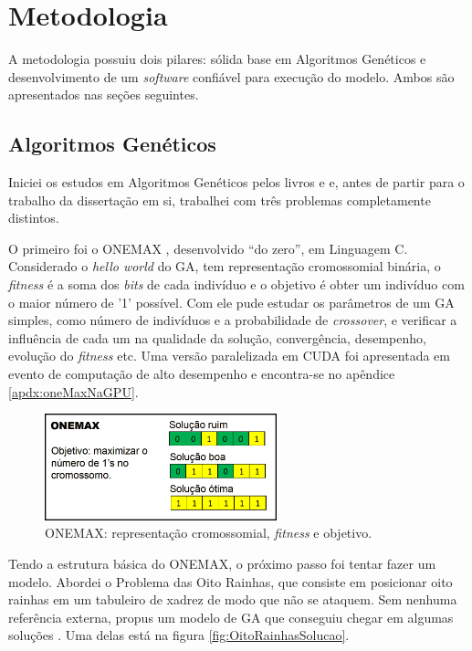 \chapter{Metodologia\label{cap:metodologia}}

	A metodologia possuiu dois pilares: sólida base em Algoritmos Genéticos e desenvolvimento de um \emph{software} confiável para execução do modelo. Ambos são apresentados nas seções seguintes.

\section{Algoritmos Genéticos}\label{seq:medologia_ga}
	
	Iniciei os estudos em Algoritmos Genéticos pelos livros \cite{Mitchell98} e \cite{Linden2008} e, antes de partir para o trabalho da dissertação em si, trabalhei com três problemas completamente distintos.
	
	O primeiro foi o ONEMAX \cite{onemaxNaGPU}, desenvolvido ``do zero'', em Linguagem C. Considerado o \emph{hello world} do GA, tem representação cromossomial binária, o \emph{fitness} é a soma dos \emph{bits} de cada indivíduo e o objetivo é obter um indivíduo com o maior número de '1' possível. Com ele pude estudar os parâmetros de um GA simples, como número de indivíduos e a probabilidade de \emph{crossover}, e verificar a influência de cada um na qualidade da solução, convergência, desempenho, evolução do \emph{fitness} etc. Uma versão paralelizada em CUDA foi apresentada em evento de computação de alto desempenho \cite{ERAD12} e encontra-se no apêndice \ref{apdx:oneMaxNaGPU}.
	
	\begin{figure}[htbp]
		\centering
			\includegraphics[width=0.60\textwidth]{figs/resultados/onemax/onemax_objetivo.png}
		\caption{ONEMAX: representação cromossomial, \emph{fitness} e objetivo.}
		\label{fig:onemax_objetivo_metodologia}
	\end{figure}
	
	Tendo a estrutura básica do ONEMAX, o próximo passo foi tentar fazer um modelo. Abordei o Problema das Oito Rainhas, que consiste em posicionar oito rainhas em um tabuleiro de xadrez de modo que não se ataquem. Sem nenhuma referência externa, propus um modelo de GA que conseguiu chegar em algumas soluções \cite{qualificacao_adriano}. Uma delas está na figura \ref{fig:OitoRainhasSolucao}.
	
